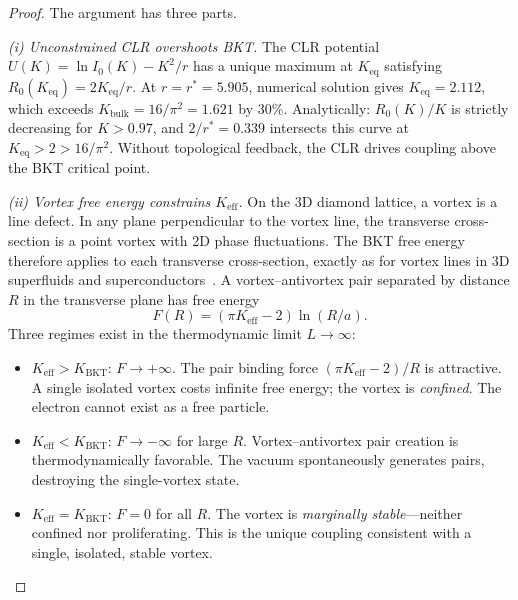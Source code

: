 \documentclass[aps,prd,onecolumn,superscriptaddress,floatfix,12pt]{revtex4-2}
\newcommand{\Rzero}{R_0}
\newcommand{\Kbulk}{K_{\text{bulk}}}
\newcommand{\KBKT}{K_{\text{BKT}}}
\begin{document}
\begin{proof}
The argument has three parts.

\emph{(i) Unconstrained CLR overshoots BKT.}
The CLR potential $U(K) = \ln I_0(K) - K^2/r$ has a unique maximum at $K_{\text{eq}}$ satisfying $\Rzero(K_{\text{eq}}) = 2K_{\text{eq}}/r$. At $r = r^* = 5.905$, numerical solution gives $K_{\text{eq}} = 2.112$, which exceeds $\Kbulk = 16/\pi^2 = 1.621$ by $30\%$. Analytically: $\Rzero(K)/K$ is strictly decreasing for $K > 0.97$, and $2/r^* = 0.339$ intersects this curve at $K_{\text{eq}} > 2 > 16/\pi^2$. Without topological feedback, the CLR drives coupling above the BKT critical point.

\emph{(ii) Vortex free energy constrains $K_{\text{eff}}$.}
On the 3D diamond lattice, a vortex is a line defect. In any plane perpendicular to the vortex line, the transverse cross-section is a point vortex with 2D phase fluctuations. The BKT free energy therefore applies to each transverse cross-section, exactly as for vortex lines in 3D superfluids and superconductors~\cite{Kosterlitz1974,NelsonKosterlitz1977}. A vortex--antivortex pair separated by distance $R$ in the transverse plane has free energy
\begin{equation}
F(R) = (\pi K_{\text{eff}} - 2)\ln(R/a).
\end{equation}
Three regimes exist in the thermodynamic limit $L \to \infty$:
\begin{itemize}
\item $K_{\text{eff}} > \KBKT$: $F \to +\infty$. The pair binding force $(\pi K_{\text{eff}} - 2)/R$ is attractive. A single isolated vortex costs infinite free energy; the vortex is \emph{confined}. The electron cannot exist as a free particle.
\item $K_{\text{eff}} < \KBKT$: $F \to -\infty$ for large $R$. Vortex--antivortex pair creation is thermodynamically favorable. The vacuum spontaneously generates pairs, destroying the single-vortex state.
\item $K_{\text{eff}} = \KBKT$: $F = 0$ for all $R$. The vortex is \emph{marginally stable}---neither confined nor proliferating. This is the unique coupling consistent with a single, isolated, stable vortex.
\end{itemize}


\end{proof}
\end{document}
